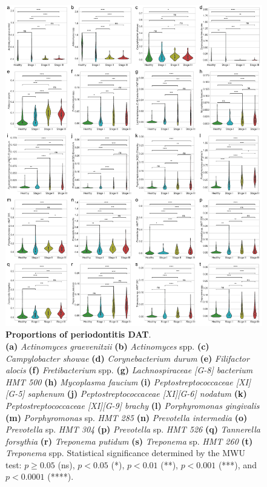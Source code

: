 \documentclass[11pt, a4paper, onecolumn, oneside]{report}
\begin{document}
            \begin{figure}[p]
                \centering
                \includegraphics[width=0.9 \linewidth]{Figures/Periodontitis/Figure_R04.pdf}
                \caption[Proportions of periodontitis DAT]{\textbf{Proportions of periodontitis DAT}. \\
                    \textbf{(a)} \textit{Actinomyces graevenitzii} \textbf{(b)} \textit{Actinomyces} spp. \textbf{(c)} \textit{Campylobacter showae} \textbf{(d)} \textit{Corynebacterium durum} \textbf{(e)} \textit{Filifactor alocis} \textbf{(f)} \textit{Fretibacterium} spp. \textbf{(g)} \textit{Lachnospiraceae [G-8] bacterium HMT 500} \textbf{(h)} \textit{Mycoplasma faucium} \textbf{(i)} \textit{Peptostreptococcaceae [XI][G-5] saphenum} \textbf{(j)} \textit{Peptostreptococcaceae [XI][G-6] nodatum} \textbf{(k)} \textit{Peptostreptococcaceae [XI][G-9] brachy} \textbf{(l)} \textit{Porphyromonas gingivalis} \textbf{(m)} \textit{Porphyromonas} sp. \textit{HMT 285} \textbf{(n)} \textit{Prevotella intermedia} \textbf{(o)} \textit{Prevotella} sp. \textit{HMT 304} \textbf{(p)} \textit{Prevotella} sp. \textit{HMT 526} \textbf{(q)} \textit{Tannerella forsythia} \textbf{(r)} \textit{Treponema putidum} \textbf{(s)} \textit{Treponema} sp. \textit{HMT 260} \textbf{(t)} \textit{Treponema} spp. Statistical significance determined by the MWU test: $p \ge 0.05$ (ns), $p < 0.05$ (*), $p < 0.01$ (**), $p < 0.001$ (***), and $p < 0.0001$ (****).}
                \label{fig:Periodontitis-proportions}
            \end{figure}
            \clearpage
\end{document}

